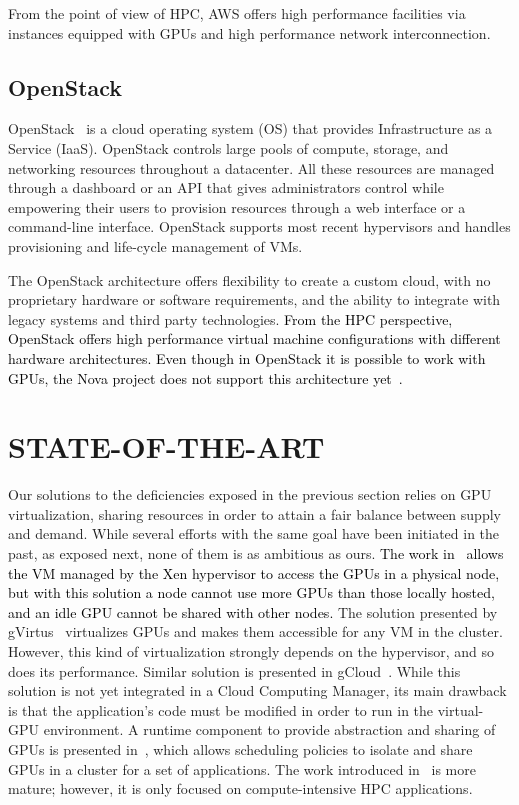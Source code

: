 \documentclass[a4paper,twoside]{article}
\begin{document}
From the point of view of HPC, AWS offers high performance facilities via 
instances equipped with GPUs and high performance network interconnection.

\subsection{OpenStack}
\label{sec:openstack}

OpenStack~\cite{OpenStack} is a cloud operating system (OS) that provides Infrastructure as a Service (IaaS). 
OpenStack controls large pools of compute, storage, and networking resources throughout a 
datacenter. All these resources are managed through a dashboard or an API that gives administrators 
control while empowering their users to provision resources through a web interface
or a command-line interface.  
OpenStack supports most recent hypervisors and handles provisioning 
and life-cycle management of VMs.
 
The OpenStack architecture offers flexibility to create a custom cloud, with no proprietary hardware
or software requirements, and the ability to integrate with legacy systems and third party technologies. 
\textcolor{black}{
From the HPC perspective, OpenStack offers high performance virtual machine configurations with different hardware architectures. 
Even though in OpenStack it is possible to work with GPUs, the Nova project does not support this architecture yet~\cite{OpenStackGPU}. 
}

\section{\uppercase{State-of-the-Art}}
\label{sec:state}
Our solutions to the deficiencies exposed in the previous section relies on GPU virtualization, sharing resources in order
to attain a fair balance between supply and demand. 
While several efforts with the same goal have been initiated in the past, as exposed next, 
none of them is as ambitious as ours. 
\textcolor{black}{
The work in~\cite{younge2013enabling} allows the VM managed
by the Xen hypervisor to access the GPUs in a physical
node, but with this solution a node cannot 
use more GPUs than those locally hosted, and an idle GPU cannot be shared with other nodes. }
The solution presented by gVirtus~\cite{gvirtus} virtualizes GPUs and makes
them accessible for any VM in the cluster. However, this kind
of virtualization strongly depends on the hypervisor, and so
does its performance. Similar solution is presented in gCloud~\cite{diab2013dynamic}. 
While this solution is not yet integrated in a Cloud Computing Manager, its main
drawback is that the application's code must be modified
in order to run in the virtual-GPU environment. A runtime component to provide abstraction
and sharing of GPUs is presented in~\cite{becchi2012virtual}, which allows scheduling policies 
to isolate and share GPUs in a cluster for a set of applications. 
The work introduced in~\cite{jungpgpu} is more mature; however,
it is only focused on compute-intensive HPC applications. 
\end{document}
